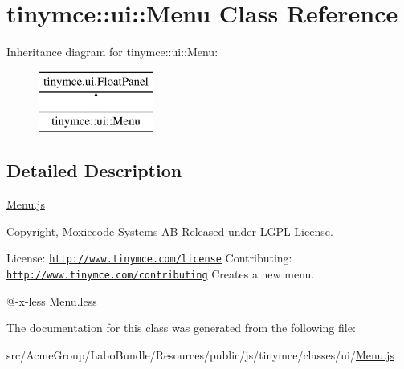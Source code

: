 \hypertarget{classtinymce_1_1ui_1_1_menu}{\section{tinymce\+:\+:ui\+:\+:Menu Class Reference}
\label{classtinymce_1_1ui_1_1_menu}
}
Inheritance diagram for tinymce\+:\+:ui\+:\+:Menu\+:\begin{figure}[H]
\begin{center}
\leavevmode
\includegraphics[height=2.000000cm]{classtinymce_1_1ui_1_1_menu}
\end{center}
\end{figure}


\subsection{Detailed Description}
\hyperlink{_menu_8js}{Menu.\+js}

Copyright, Moxiecode Systems A\+B Released under L\+G\+P\+L License.

License\+: \href{http://www.tinymce.com/license}{\tt http\+://www.\+tinymce.\+com/license} Contributing\+: \href{http://www.tinymce.com/contributing}{\tt http\+://www.\+tinymce.\+com/contributing} Creates a new menu.

@-\/x-\/less Menu.\+less 

The documentation for this class was generated from the following file\+:\begin{DoxyCompactItemize}
\item 
src/\+Acme\+Group/\+Labo\+Bundle/\+Resources/public/js/tinymce/classes/ui/\hyperlink{_menu_8js}{Menu.\+js}\end{DoxyCompactItemize}
